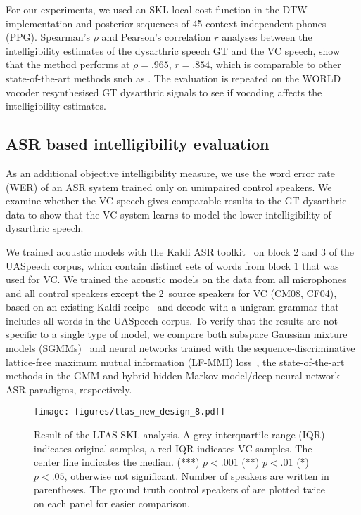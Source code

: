 \documentclass[a4paper]{article}
\begin{document}
For our experiments, we used an SKL local cost function in the DTW implementation and posterior sequences of 45 context-independent phones (PPG). Spearman's $\rho$ and Pearson's correlation $r$ analyses between the intelligibility estimates of the dysarthric speech GT and the VC speech, show that the method performs at $\rho=.965$, $r=.854$, which is comparable to other state-of-the-art methods such as \cite{janbakhshi2019pathological}. The evaluation is repeated on the WORLD vocoder resynthesised GT dysarthric signals to see if vocoding affects the intelligibility estimates.

\subsection{ASR based intelligibility evaluation}
\label{sec:asr}


As an additional objective intelligibility measure, we use the word error rate
(WER) of an ASR system trained only on unimpaired control speakers. We examine
whether the VC speech gives comparable results to the GT dysarthric data to show that the VC system learns to model the lower intelligibility of dysarthric speech.

We trained acoustic models with the Kaldi ASR toolkit~\cite{Povey2011} on block 2
and 3 of the UASpeech corpus, which contain distinct sets of words from block 1 that was used for VC. We
trained the acoustic models on the data from all microphones and all control speakers
except the 2~source speakers for VC (CM08, CF04), based on an existing Kaldi recipe~\cite{Anonymous2020} and decode with a
unigram grammar that includes all words in the UASpeech corpus. To verify that the results are not specific to a single type of model, we compare both
subspace Gaussian mixture models (SGMMs)~\cite{Povey2010} and neural networks
trained with the sequence-discriminative lattice-free maximum mutual information
(LF-MMI) loss~\cite{Povey2016}, the state-of-the-art methods in the GMM and hybrid hidden Markov model/deep neural network ASR paradigms, respectively. 


\begin{figure*}[ht]
    \centering
    \texttt{[image: figures/ltas\_new\_design\_8.pdf]}
    \caption{Result of the LTAS-SKL analysis. A grey interquartile range (IQR) indicates original samples, a red IQR indicates VC samples. The center line indicates the median. (***) $p < .001$ (**) $p < .01$ (*) $p < .05$, otherwise not significant. Number of speakers are written in parentheses. The ground truth control speakers of are plotted twice on each panel for easier comparison.}
    \label{fig:ltas_experiment_2}
\end{figure*}
\end{document}
